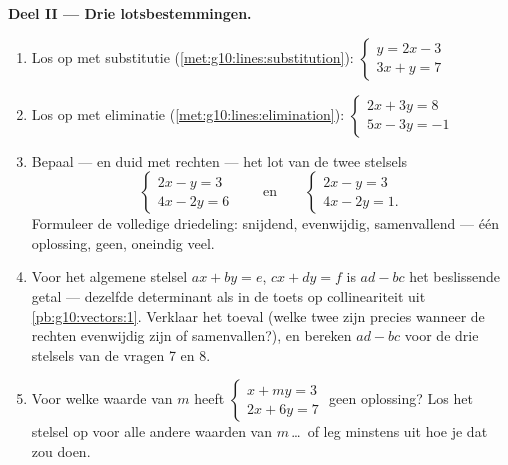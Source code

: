 \begin{problem}
\medskip
\noindent\textbf{Deel II --- Drie lotsbestemmingen.}
\begin{enumerate}[resume]
  \item Los op met substitutie (\cref{met:g10:lines:substitution}):
        $\begin{cases} y = 2x - 3 \\ 3x + y = 7 \end{cases}$
  \item Los op met eliminatie (\cref{met:g10:lines:elimination}):
        $\begin{cases} 2x + 3y = 8 \\ 5x - 3y = -1 \end{cases}$
  \item Bepaal --- en duid met rechten --- het lot van de twee stelsels
        \[
        \begin{cases} 2x - y = 3 \\ 4x - 2y = 6 \end{cases}
        \qquad\text{en}\qquad
        \begin{cases} 2x - y = 3 \\ 4x - 2y = 1 . \end{cases}
        \]
        Formuleer de volledige driedeling: snijdend, evenwijdig, samenvallend
        --- één oplossing, geen, oneindig veel.
  \item Voor het algemene stelsel $ax + by = e$, $cx + dy = f$ is $ad - bc$
        het beslissende getal --- dezelfde determinant als in de toets op
        collineariteit uit \cref{pb:g10:vectors:1}. Verklaar het toeval (welke
        twee  zijn  precies wanneer de rechten evenwijdig
        zijn of samenvallen?), en bereken $ad - bc$ voor de drie stelsels van
        de vragen 7 en 8.
  \item Voor welke waarde van $m$ heeft
        $\begin{cases} x + my = 3 \\ 2x + 6y = 7 \end{cases}$ geen oplossing?
        Los het stelsel op voor alle andere waarden van $m$\,\dots\ of leg
        minstens uit hoe je dat zou doen.
\end{enumerate}


\end{problem}
